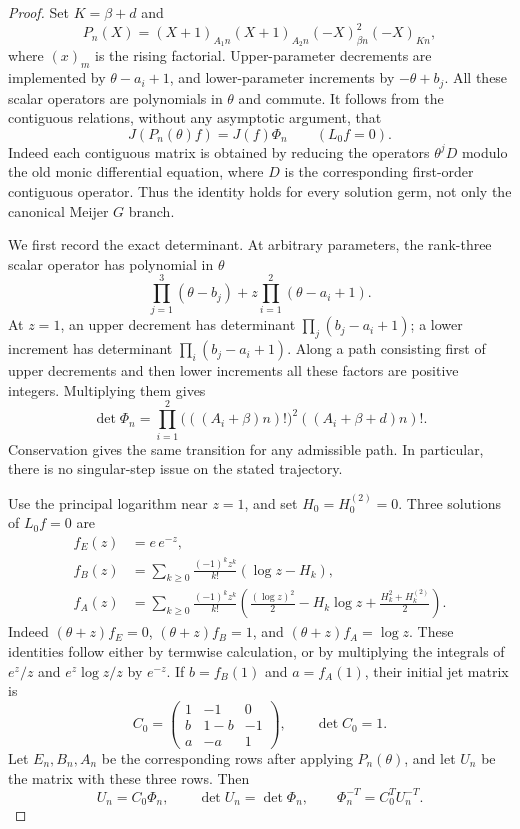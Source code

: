 \documentclass[11pt,a4paper]{article}
\theoremstyle{definition}
\theoremstyle{remark}
\numberwithin{equation}{section}
\begin{document}
\begin{proof}
Set $K=\beta+d$ and
\[
 P_n(X)=(X+1)_{A_1n}(X+1)_{A_2n}
              (-X)_{\beta n}^{2}(-X)_{Kn},
\]
where $(x)_m$ is the rising factorial. Upper-parameter decrements are
implemented by $\theta-a_i+1$, and lower-parameter increments by
$-\theta+b_j$. All these scalar operators are polynomials in $\theta$
and commute. It follows from the contiguous relations, without any
asymptotic argument, that
\begin{equation}
 J(P_n(\theta)f)=J(f)\Phi_n\qquad(L_0f=0).
 \label{p3:eq:cmf-contiguity}
\end{equation}
Indeed each contiguous matrix is obtained by reducing the operators
$\theta^jD$ modulo the old monic differential equation, where $D$ is
the corresponding first-order contiguous operator. Thus the identity
holds for every solution germ, not only the canonical Meijer $G$ branch.

We first record the exact determinant. At arbitrary parameters, the
rank-three scalar operator has polynomial in $\theta$
\[
 \prod_{j=1}^3(\theta-b_j)+z\prod_{i=1}^2(\theta-a_i+1).
\]
At $z=1$, an upper decrement has determinant
$\prod_j(b_j-a_i+1)$; a lower increment has determinant
$\prod_i(b_j-a_i+1)$. Along a path consisting first of upper decrements
and then lower increments all these factors are positive integers.
Multiplying them gives
\begin{equation}
 \det\Phi_n=\prod_{i=1}^2
       \bigl(((A_i+\beta)n)!\bigr)^2
       ((A_i+\beta+d)n)!.
 \label{p3:eq:cmf-determinant}
\end{equation}
Conservation gives the same transition for any admissible path. In
particular, there is no singular-step issue on the stated trajectory.

Use the principal logarithm near $z=1$, and set $H_0=H_0^{(2)}=0$.
Three solutions of $L_0f=0$ are
\begin{align*}
 f_E(z)&=e\,e^{-z},\\
 f_B(z)&=\sum_{k\geq0}\frac{(-1)^kz^k}{k!}
                      (\log z-H_k),\\
 f_A(z)&=\sum_{k\geq0}\frac{(-1)^kz^k}{k!}
       \left(\frac{(\log z)^2}{2}-H_k\log z
                         +\frac{H_k^2+H_k^{(2)}}2\right).
\end{align*}
Indeed $(\theta+z)f_E=0$, $(\theta+z)f_B=1$, and
$(\theta+z)f_A=\log z$. These identities follow either by termwise
calculation, or by multiplying the integrals of $e^z/z$ and
$e^z\log z/z$ by $e^{-z}$. If $b=f_B(1)$ and $a=f_A(1)$, their initial
jet matrix is
\[
 C_0=\begin{pmatrix}1&-1&0\\b&1-b&-1\\a&-a&1\end{pmatrix},
 \qquad\det C_0=1.
\]
Let $E_n,B_n,A_n$ be the corresponding rows after applying $P_n(\theta)$,
and let $U_n$ be the matrix with these three rows. Then
\[
 U_n=C_0\Phi_n,\qquad \det U_n=\det\Phi_n,
 \qquad\Phi_n^{-T}=C_0^T U_n^{-T}.
\]


\end{proof}
\end{document}
